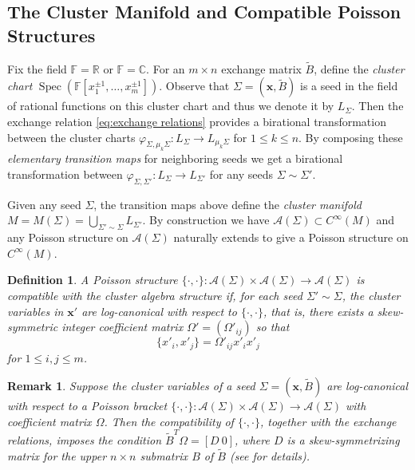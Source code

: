 \documentclass{amsart}
\newtheorem{definition}[theorem]{Definition}
\newtheorem{remark}[theorem]{Remark}
\newcommand{\bfx}{\mathbf{x}}
\newcommand{\cA}{\mathcal{A}}
\newcommand{\CC}{\mathbb{C}}
\newcommand{\FF}{\mathbb{F}}
\newcommand{\RR}{\mathbb{R}}
\newcommand{\Spec}{\operatorname{Spec}}
\begin{document}
\subsection{The Cluster Manifold and Compatible Poisson Structures}
Fix the field $\FF=\RR$ or $\FF=\CC$.
For an $m\times n$ exchange matrix $\tilde B$, define the \emph{cluster chart} $\Spec(\FF[x_1^{\pm1},\ldots,x_m^{\pm1}])$.
Observe that $\Sigma=(\bfx,\tilde B)$ is a seed in the field of rational functions on this cluster chart and thus we denote it by $L_\Sigma$.
Then the exchange relation \eqref{eq:exchange relations} provides a birational transformation between the cluster charts $\varphi_{\Sigma,\mu_k\Sigma}:L_\Sigma\to L_{\mu_k\Sigma}$ for $1\le k\le n$.
By composing these \emph{elementary transition maps} for neighboring seeds we get a birational transformation between $\varphi_{\Sigma,\Sigma'}:L_\Sigma\to L_{\Sigma'}$ for any seeds $\Sigma\sim\Sigma'$.

Given any seed $\Sigma$, the transition maps above define the \emph{cluster manifold} $M=M(\Sigma)=\bigcup\limits_{\Sigma'\sim\Sigma}L_{\Sigma'}$.
By construction we have $\cA(\Sigma)\subset C^\infty(M)$ and any Poisson structure on $\cA(\Sigma)$ naturally extends to give a Poisson structure on $C^\infty(M)$.

\begin{definition}
  A Poisson structure $\{\cdot,\cdot\}:\cA(\Sigma)\times\cA(\Sigma)\to\cA(\Sigma)$ is \emph{compatible} with the cluster algebra structure if, for each seed $\Sigma'\sim\Sigma$, the cluster variables in $\bfx'$ are \emph{log-canonical} with respect to $\{\cdot,\cdot\}$, that is, there exists a skew-symmetric integer \emph{coefficient matrix} $\Omega'=(\Omega'_{ij})$ so that 
  \begin{equation}
    \label{eq:log-canonical bracket}
    \{x'_i,x'_j\}=\Omega'_{ij}x'_ix'_j
  \end{equation}
  for $1\le i,j\le m$.
\end{definition}
\begin{remark}
  Suppose the cluster variables of a seed $\Sigma=(\bfx,\tilde B)$ are log-canonical with respect to a Poisson bracket $\{\cdot,\cdot\}:\cA(\Sigma)\times\cA(\Sigma)\to\cA(\Sigma)$ with coefficient matrix $\Omega$.
  Then the compatibility of $\{\cdot,\cdot\}$, together with the exchange relations, imposes the condition $\tilde B^T\Omega=[D\ 0]$, where $D$ is a skew-symmetrizing matrix for the upper $n\times n$ submatrix $B$ of $\tilde B$ (see \cite{berenstein-zelevinsky,gekhtman-shapiro-vainshtein} for details).
\end{remark}
\end{document}
